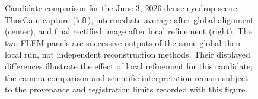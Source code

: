 \documentclass{article}
\begin{document}
\begin{figure}[htbp]
    \centering
    

    \caption{Candidate comparison for the June 3, 2026 dense eyedrop scene: ThorCam capture (left), intermediate average after global alignment (center), and final rectified image after local refinement (right). The two FLFM panels are successive outputs of the same global-then-local run, not independent reconstruction methods. Their displayed differences illustrate the effect of local refinement for this candidate; the camera comparison and scientific interpretation remain subject to the provenance and registration limits recorded with this figure.}
    \label{fig:reconstruction_comparison}
\end{figure}
\end{document}
